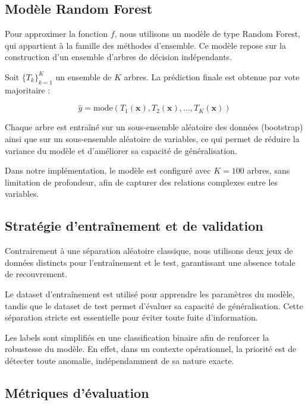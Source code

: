 \documentclass[11pt]{article}
\begin{document}
\subsection{Modèle Random Forest}

Pour approximer la fonction $f$, nous utilisons un modèle de type Random Forest, qui appartient à la famille des méthodes d’ensemble. Ce modèle repose sur la construction d’un ensemble d’arbres de décision indépendants.

Soit $\{T_k\}_{k=1}^K$ un ensemble de $K$ arbres. La prédiction finale est obtenue par vote majoritaire :

\begin{equation}
\hat{y} = \mathrm{mode} \left( T_1(\mathbf{x}), T_2(\mathbf{x}), \dots, T_K(\mathbf{x}) \right)
\end{equation}

Chaque arbre est entraîné sur un sous-ensemble aléatoire des données (bootstrap) ainsi que sur un sous-ensemble aléatoire de variables, ce qui permet de réduire la variance du modèle et d’améliorer sa capacité de généralisation.

Dans notre implémentation, le modèle est configuré avec $K = 100$ arbres, sans limitation de profondeur, afin de capturer des relations complexes entre les variables.

\subsection{Stratégie d’entraînement et de validation}

Contrairement à une séparation aléatoire classique, nous utilisons deux jeux de données distincts pour l’entraînement et le test, garantissant une absence totale de recouvrement.

Le dataset d’entraînement est utilisé pour apprendre les paramètres du modèle, tandis que le dataset de test permet d’évaluer sa capacité de généralisation. Cette séparation stricte est essentielle pour éviter toute fuite d’information.

Les labels sont simplifiés en une classification binaire afin de renforcer la robustesse du modèle. En effet, dans un contexte opérationnel, la priorité est de détecter toute anomalie, indépendamment de sa nature exacte.

\subsection{Métriques d’évaluation}
\end{document}

